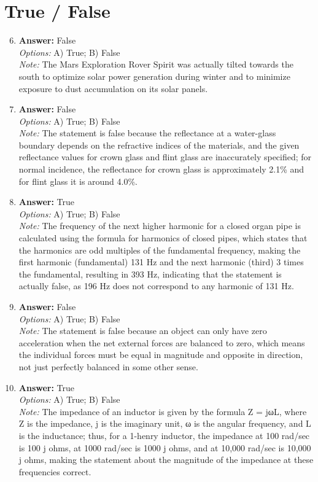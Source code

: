 \documentclass[12pt]{article}
\begin{document}
\section*{True / False}
\begin{enumerate}[label=\arabic*.]
\setcounter{enumi}{5}
\item \textbf{Answer:} False
\\ \textit{Options:} A) True; B) False
\\ \textit{Note:} The Mars Exploration Rover Spirit was actually tilted towards the south to optimize solar power generation during winter and to minimize exposure to dust accumulation on its solar panels.
\item \textbf{Answer:} False
\\ \textit{Options:} A) True; B) False
\\ \textit{Note:} The statement is false because the reflectance at a water-glass boundary depends on the refractive indices of the materials, and the given reflectance values for crown glass and flint glass are inaccurately specified; for normal incidence, the reflectance for crown glass is approximately 2.1\% and for flint glass it is around 4.0\%.
\item \textbf{Answer:} True
\\ \textit{Options:} A) True; B) False
\\ \textit{Note:} The frequency of the next higher harmonic for a closed organ pipe is calculated using the formula for harmonics of closed pipes, which states that the harmonics are odd multiples of the fundamental frequency, making the first harmonic (fundamental) 131 Hz and the next harmonic (third) 3 times the fundamental, resulting in 393 Hz, indicating that the statement is actually false, as 196 Hz does not correspond to any harmonic of 131 Hz.
\item \textbf{Answer:} False
\\ \textit{Options:} A) True; B) False
\\ \textit{Note:} The statement is false because an object can only have zero acceleration when the net external forces are balanced to zero, which means the individual forces must be equal in magnitude and opposite in direction, not just perfectly balanced in some other sense.
\item \textbf{Answer:} True
\\ \textit{Options:} A) True; B) False
\\ \textit{Note:} The impedance of an inductor is given by the formula Z = jωL, where Z is the impedance, j is the imaginary unit, ω is the angular frequency, and L is the inductance; thus, for a 1-henry inductor, the impedance at 100 rad/sec is 100 j ohms, at 1000 rad/sec is 1000 j ohms, and at 10,000 rad/sec is 10,000 j ohms, making the statement about the magnitude of the impedance at these frequencies correct.
\end{enumerate}
\end{document}
